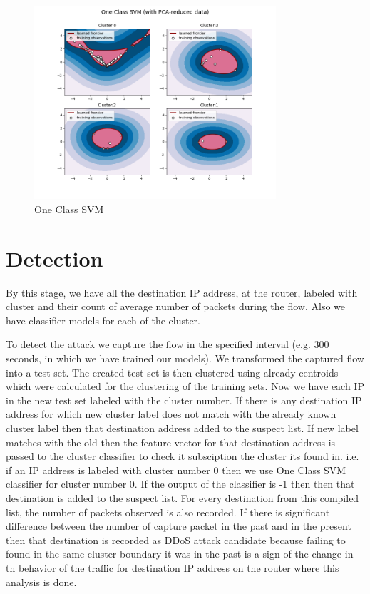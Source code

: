 \documentclass[12pt,oneside,a4paper]{article}
\begin{document}
\begin{figure}[H]
\centering
\includegraphics[width=0.80\textwidth]{one-class-SVM.png}
\caption{One Class SVM} \label{fig:one-class-SVM}
\end{figure}


\section{Detection}

By this stage, we have all the destination IP address, at the router, labeled with cluster and their count of average number of packets during the flow. Also we have classifier models for each of the cluster.

To detect the attack we capture the flow in the specified interval (e.g. 300 seconds, in which we have trained our models). We transformed the captured flow into a test set. The created test set is then clustered using already centroids which were calculated for the clustering of the training sets. Now we have each IP in the new test set labeled with the cluster number. If there is any destination IP address for which new cluster label does not match with the already known cluster label then that destination address added to the suspect list. If new label matches with the old then the feature vector for that destination address is passed to the cluster classifier to check it subsciption the cluster its found in. i.e. if an IP address is labeled with cluster number 0 then we use One Class SVM classifier for cluster number 0. If the output of the classifier is -1 then then that destination is added to the suspect list. For every destination from this compiled list, the number of packets observed is also recorded. If there is significant difference between the number of capture packet in the past and in the present then that destination is recorded as DDoS attack candidate because failing to found in the same cluster boundary it was in the past is a sign of the change in th behavior of the traffic for destination IP address on the router where this analysis is done.
\end{document}
